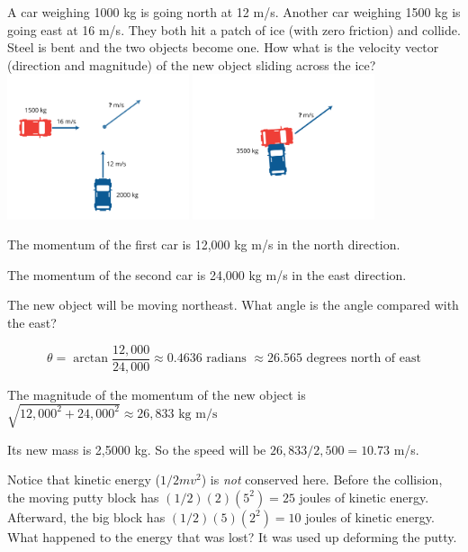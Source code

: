 \begin{Exercise}[title={Cars on Ice}, label=cars_on_ice]
A car weighing 1000 kg is going north at 12 m/s.  Another car weighing
1500 kg is going east at 16 m/s.  They both hit a patch of ice (with
zero friction) and collide.  Steel is bent and the two objects become
one.  How what is the velocity vector (direction and magnitude) of the
new object sliding across the ice?
\includegraphics[width=0.4\textwidth]{icecar.png}
\includegraphics[width=0.4\textwidth]{icecar2.png}

\end{Exercise}
\begin{Answer}[ref=cars_on_ice]
  The momentum of the first car is 12,000 kg m/s in the north direction.

  The momentum of the second car is 24,000 kg m/s in the east direction.

  The new object will be moving northeast. What angle is the angle compared with the east?

  $$\theta = \arctan{\frac{12,000}{24,000}} \approx 0.4636 \text{ radians } \approx 26.565\text{ degrees north of east}$$

  The magnitude of the momentum of the new object is $\sqrt{12,000^2 + 24,000^2} \approx 26,833\text{ kg m/s}$

  Its new mass is 2,5000 kg.  So the speed will be $26,833/2,500 = 10.73$ m/s.
\end{Answer}


Notice that kinetic energy ($1/2 m v^2$) is \emph{not} conserved
here.  Before the collision, the moving putty block has $(1/2)(2)(5^2) = 25$
joules of kinetic energy.  Afterward, the big block has $(1/2)(5)(2^2)
= 10$ joules of kinetic energy.  What happened to the energy that was
lost? It was used up deforming the putty.

